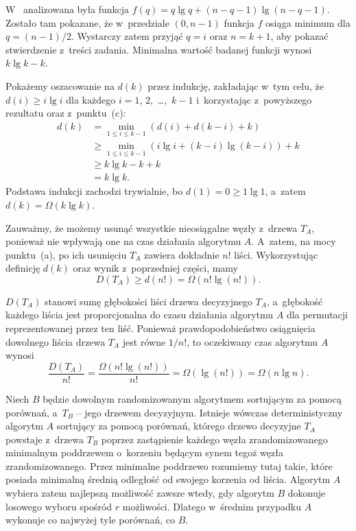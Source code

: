 \subproblem %
W~ analizowana była funkcja $f(q)=q\lg q+(n-q-1)\lg(n-q-1)$.
Zostało tam pokazane, że w~przedziale $(0,n-1)$ funkcja $f$ osiąga minimum dla $q=(n-1)/2$.
Wystarczy zatem przyjąć $q=i$ oraz $n=k+1$, aby pokazać stwierdzenie z~treści zadania.
Minimalna wartość badanej funkcji wynosi $k\lg k-k$.

Pokażemy oszacowanie na $d(k)$ przez indukcję, zakładając w~tym celu, że $d(i)\ge i\lg i$ dla każdego $i=1$, 2,~\dots,~$k-1$ i~korzystając z~powyższego rezultatu oraz z~punktu~(c):
\begin{align*}
	d(k) &= \min_{1\le i\le k-1}(d(i)+d(k-i)+k) \\
	&\ge \min_{1\le i\le k-1}(i\lg i+(k-i)\lg(k-i))+k \\
	&\ge k\lg k-k+k \\
	&= k\lg k.
\end{align*}
Podstawa indukcji zachodzi trywialnie, bo $d(1)=0\ge 1\lg1$, a~zatem $d(k)=\Omega(k\lg k)$.

\subproblem %
Zauważmy, że możemy usunąć wszystkie nieosiągalne węzły z~drzewa $T_A$, ponieważ nie wpływają one na czas działania algorytmu $A$.
A~zatem, na mocy punktu~(a), po ich usunięciu $T_A$ zawiera dokładnie $n!$ liści.
Wykorzystując definicję $d(k)$ oraz wynik z~poprzedniej części, mamy
\[
	D(T_A) \ge d(n!) = \Omega(n!\lg(n!)).
\]

$D(T_A)$ stanowi sumę głębokości liści drzewa decyzyjnego $T_A$, a~głębokość każdego liścia jest proporcjonalna do czasu działania algorytmu $A$ dla permutacji reprezentowanej przez ten liść.
Ponieważ prawdopodobieństwo osiągnięcia dowolnego liścia drzewa $T_A$ jest równe $1/n!$, to oczekiwany czas algorytmu $A$ wynosi
\[
	\frac{D(T_A)}{n!} = \frac{\Omega(n!\lg(n!))}{n!} = \Omega(\lg(n!)) = \Omega(n\lg n).
\]

\subproblem %
Niech $B$ będzie dowolnym randomizowanym algorytmem sortującym za pomocą porównań, a~$T_B$ -- jego drzewem decyzyjnym.
Istnieje wówczas deterministyczny algorytm $A$ sortujący za pomocą porównań, którego drzewo decyzyjne $T_A$ powstaje z~drzewa $T_B$ poprzez zastąpienie każdego węzła zrandomizowanego minimalnym poddrzewem o~korzeniu będącym synem tegoż węzła zrandomizowanego.
Przez minimalne poddrzewo rozumiemy tutaj takie, które posiada minimalną średnią odległość od swojego korzenia od liścia.
Algorytm $A$ wybiera zatem najlepszą możliwość zawsze wtedy, gdy algorytm $B$ dokonuje losowego wyboru spośród $r$ możliwości.
Dlatego w~średnim przypadku $A$ wykonuje co najwyżej tyle porównań, co $B$.


